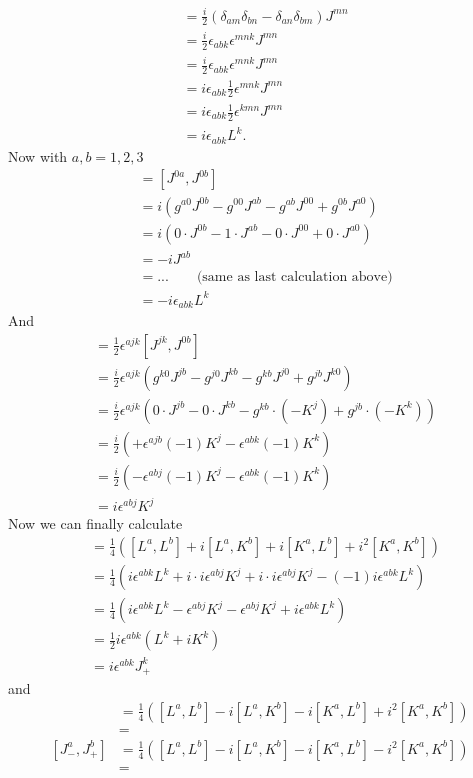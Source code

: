 \documentclass[10pt,a4paper]{book}
\theoremstyle{definition}
\begin{document}
\begin{enumerate}[(a)]
\begin{align}
&=\frac{i}{2}(\delta_{am}\delta_{bn}-\delta_{an}\delta_{bm})J^{mn}\\
&=\frac{i}{2}\epsilon_{abk}\epsilon^{mnk}J^{mn}\\
&=\frac{i}{2}\epsilon_{abk}\epsilon^{mnk}J^{mn}\\
&=i\epsilon_{abk}\frac{1}{2}\epsilon^{mnk}J^{mn}\\
&=i\epsilon_{abk}\frac{1}{2}\epsilon^{kmn}J^{mn}\\
&=i\epsilon_{abk}L^k.
\end{align}
Now with $a,b=1,2,3$
\begin{align}
[K^a,K^b]
&=[J^{0a},J^{0b}]\\
&=i(g^{a0}J^{0b}-g^{00}J^{ab}-g^{ab}J^{00}+g^{0b}J^{a0})\\
&=i(0\cdot J^{0b}-1\cdot J^{ab}-0\cdot J^{00}+0\cdot J^{a0})\\
&=-iJ^{ab}\\
&=...\qquad\text{(same as last calculation above)}\\
&=-i\epsilon_{abk}L^k
\end{align}
And
\begin{align}
[L^a,K^b]
&=\frac{1}{2}\epsilon^{ajk}[J^{jk},J^{0b}]\\
&=\frac{i}{2}\epsilon^{ajk}(g^{k0}J^{jb}-g^{j0}J^{kb}-g^{kb}J^{j0}+g^{jb}J^{k0})\\
&=\frac{i}{2}\epsilon^{ajk}\left(0\cdot J^{jb}-0\cdot J^{kb}-g^{kb}\cdot(-K^j)+g^{jb}\cdot(-K^k)\right)\\
&=\frac{i}{2}\left(+\epsilon^{ajb}(-1)K^j-\epsilon^{abk}(-1)K^k\right)\\
&=\frac{i}{2}\left(-\epsilon^{abj}(-1)K^j-\epsilon^{abk}(-1)K^k\right)\\
&=i\epsilon^{abj}K^j
\end{align}
Now we can finally calculate 
\begin{align}
[J_+^a,J_+^b]&=\frac{1}{4}\left([L^a,L^b]+i[L^a,K^b]+i[K^a,L^b]+i^2[K^a,K^b]\right)\\
&=\frac{1}{4}\left(i\epsilon^{abk}L^k+i\cdot i\epsilon^{abj}K^j+i\cdot i\epsilon^{abj}K^j-(-1)i\epsilon^{abk}L^k\right)\\
&=\frac{1}{4}\left(i\epsilon^{abk}L^k-\epsilon^{abj}K^j-\epsilon^{abj}K^j+i\epsilon^{abk}L^k\right)\\
&=\frac{1}{2}i\epsilon^{abk}(L^k+iK^k)\\
&=i\epsilon^{abk}J_+^k
\end{align}
and
\begin{align}
[J_-^a,J_-^b]&=\frac{1}{4}\left([L^a,L^b]-i[L^a,K^b]-i[K^a,L^b]+i^2[K^a,K^b]\right)\\
&=\\
[J_-^a,J_+^b]&=\frac{1}{4}\left([L^a,L^b]-i[L^a,K^b]-i[K^a,L^b]-i^2[K^a,K^b]\right)\\
&=
\end{align}

\end{enumerate}
\end{document}
